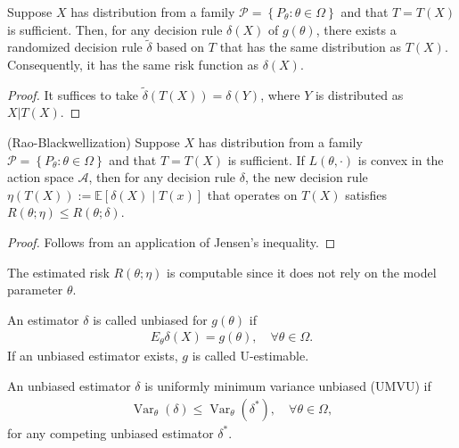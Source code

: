  \begin{thm}
     Suppose $X$ has distribution from a family $\mathcal{P}=\left\{P_\theta: \theta \in \Omega\right\}$ and that $T=T(X)$ is sufficient. Then, for any decision rule $\delta(X)$ of $g(\theta)$, there exists a randomized decision rule $\tilde{\delta}$ based on $T$ that has the same distribution as $T(X)$. Consequently, it has the same risk function as $\delta(X)$.
 \end{thm}

\begin{proof}
    It suffices to take $\tilde\delta(T(X))=\delta(Y)$, where $Y$ is distributed as $X|T(X)$.
\end{proof}

 \begin{thm}
     (Rao-Blackwellization) Suppose $X$ has distribution from a family $\mathcal{P}=\left\{P_\theta: \theta \in \Omega\right\}$ and that $T=T(X)$ is sufficient. If $L(\theta, \cdot)$ is convex in the action space $\mathcal{A}$, then for any decision rule $\delta$, the new decision rule $\eta(T(X)):=\mathbb{E}[\delta(X) \mid T(x)]$ that operates on $T(X)$ satisfies $R(\theta ; \eta) \leq R(\theta ; \delta)$. 
 \end{thm}

\begin{proof}
    Follows from an application of Jensen's inequality.
\end{proof}

\begin{remark}
    The estimated risk $R(\theta ; \eta)$ is computable since it does not rely on the model parameter $\theta$.
\end{remark}

\begin{de}
    An estimator $\delta$ is called unbiased for $g(\theta)$ if
\begin{align*}
E_\theta \delta(X)=g(\theta), \quad \forall \theta \in \Omega .
\end{align*}
If an unbiased estimator exists, $g$ is called U-estimable.
\end{de}



\begin{de}
    An unbiased estimator $\delta$ is uniformly minimum variance unbiased (UMVU) if
\begin{align*}
\operatorname{Var}_\theta(\delta) \leq \operatorname{Var}_\theta\left(\delta^*\right), \quad \forall \theta \in \Omega,
\end{align*}
for any competing unbiased estimator $\delta^*$.
\end{de}

